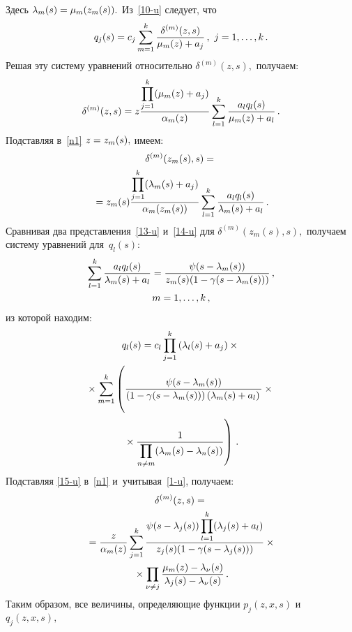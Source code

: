 \begin{multicols}{2}
\vspace*{-12pt}

\pagebreak

\noindent
Здесь $\lambda_m(s)\hm=\mu_m(z_m(s)).$ Из~\eqref{10-u} следует, что
$$
q_j(s)=c_j\sum\limits_{m=1}^k\fr{\delta^{(m)}(z,s)}{\mu_m(z)+a_j}\,,\ j=1,\ldots,k \,.
$$
Решая эту систему уравнений относительно $\delta^{(m)}(z,s),$ получаем:
\begin{equation}
\label{n1}
\delta^{(m)}(z,s)=z\displaystyle\frac{\displaystyle \prod\limits_{j=1}^k(\mu_m(z)+a_j)\mathstrut}{\displaystyle \alpha_m(z)\mathstrut}
\sum\limits_{l=1}^k\displaystyle\frac{\displaystyle a_lq_l(s)\mathstrut}{\displaystyle \mu_m(z)+a_l\mathstrut}\,.
\end{equation}
Подставляя в~\eqref{n1} $z\hm=z_m(s),$ имеем:
\begin{multline}
\label{14-u}
\delta^{(m)}(z_m(s),s)={}\\
{}=z_m(s)\displaystyle\frac{\displaystyle \prod\limits_{j=1}^k(\lambda_m(s)+a_j)\mathstrut}{\displaystyle \alpha_m(z_m(s))\mathstrut}\sum\limits_{l=1}^k\displaystyle\frac{\displaystyle a_lq_l(s)\mathstrut}{\displaystyle \lambda_m(s)+a_l\mathstrut}\,.
\end{multline}
Сравнивая два представления~\eqref{13-u} и~\eqref{14-u} для $\delta^{(m)}(z_m(s),s),$ 
получаем систему уравнений для~$q_l(s)$:
\begin{multline*}
\sum\limits_{l=1}^k\displaystyle\frac{\displaystyle a_lq_l(s)\mathstrut}{\displaystyle \lambda_m(s)+a_l\mathstrut}=
\displaystyle\frac{\displaystyle \psi(s-\lambda_m(s))\mathstrut}{\displaystyle z_m(s)(1-\gamma(s-\lambda_m(s)))\mathstrut}\,,\\
m=1,\ldots,k\,,
\end{multline*}
из которой находим:
\begin{multline}
\label{15-u}
q_l(s)=c_l\prod\limits_{j=1}^k\left(\lambda_l(s)+a_j\right)\times{}\\
{}\times
\sum\limits_{m=1}^k
\left(
\vphantom{\fr{1}{\prod\limits_{n\ne m}(\lambda_m(s)-\lambda_n(s))}}
 \fr{\psi(s-\lambda_m(s))}{ 
 \left(1-
\gamma(s-\lambda_m(s))\right)\left(\lambda_m(s)+a_l\right)}\times{}\right.\\
\left.{}\times \fr{1}{\prod\limits_{n\ne m}(\lambda_m(s)-\lambda_n(s))}\right)\,.
\end{multline}
Подставляя \eqref{15-u} в~\eqref{n1} и~учитывая~\eqref{1-u}, получаем:
\begin{multline}
\label{16-u}
\delta^{(m)}(z,s)={}\\
{}=\displaystyle\frac{\displaystyle z\mathstrut}{\displaystyle \alpha_m(z)\mathstrut}\sum\limits_{j=1}^k\displaystyle\frac{\displaystyle \psi(s-\lambda_j(s))\prod\limits_{l=1}^k(\lambda_j(s)+a_l)\mathstrut}{\displaystyle z_j(s)(1-\gamma(s-\lambda_j(s)))\mathstrut}\times{}\\
{}\times
\prod\limits_{\nu\ne j}\displaystyle\frac{\displaystyle \mu_m(z)-\lambda_{\nu}(s)\mathstrut}{\displaystyle \lambda_j(s)-\lambda_{\nu}(s)\mathstrut}\,.
\end{multline}
Таким образом, все величины, определяющие функции $p_j(z,x,s)$ и~$q_j(z,x,s),$ 

\end{multicols}

